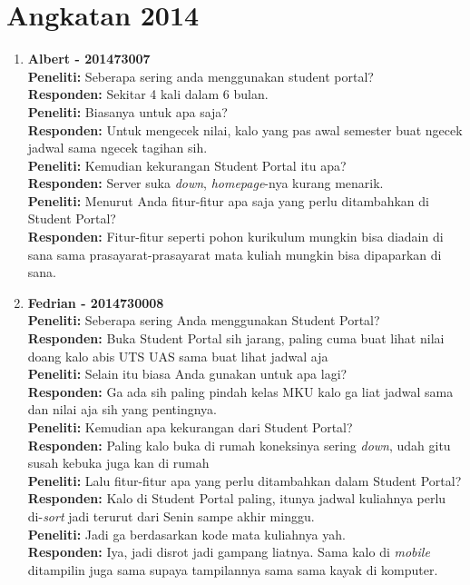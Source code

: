 \section{Angkatan 2014}
\begin{enumerate}
	\item\textbf{Albert - 201473007}\\
	\textbf{Peneliti:} Seberapa sering anda menggunakan student portal?\\
	\textbf{Responden:} Sekitar 4 kali dalam 6 bulan.\\
	\textbf{Peneliti:} Biasanya untuk apa saja?\\
	\textbf{Responden:} Untuk mengecek nilai, kalo yang pas awal semester buat ngecek jadwal sama ngecek tagihan sih.\\
	\textbf{Peneliti:} Kemudian kekurangan Student Portal itu apa?\\
	\textbf{Responden:} Server suka \textit{down}, \textit{homepage}-nya kurang menarik.\\
	\textbf{Peneliti:} Menurut Anda fitur-fitur apa saja yang perlu ditambahkan di Student Portal?\\
	\textbf{Responden:} Fitur-fitur seperti pohon kurikulum mungkin bisa diadain di sana sama prasayarat-prasayarat mata kuliah mungkin bisa dipaparkan di sana.\\
	
	\item\textbf{Fedrian - 2014730008}\\
	\textbf{Peneliti:} Seberapa sering Anda menggunakan Student Portal?\\
	\textbf{Responden:} Buka Student Portal sih jarang, paling cuma buat lihat nilai doang kalo abis UTS UAS sama buat lihat jadwal aja\\
	\textbf{Peneliti:} Selain itu biasa Anda gunakan untuk apa lagi?\\
	\textbf{Responden:} Ga ada sih paling pindah kelas MKU kalo ga liat jadwal sama dan nilai aja sih yang pentingnya.\\
	\textbf{Peneliti:} Kemudian apa kekurangan dari Student Portal?\\
	\textbf{Responden:} Paling kalo buka di rumah koneksinya sering \textit{down}, udah gitu susah kebuka juga kan di rumah\\
	\textbf{Peneliti:} Lalu fitur-fitur apa yang perlu ditambahkan dalam Student Portal?\\
	\textbf{Responden:} Kalo di Student Portal paling, itunya jadwal kuliahnya perlu di-\textit{sort} jadi terurut dari Senin sampe akhir minggu.\\
	\textbf{Peneliti:} Jadi ga berdasarkan kode mata kuliahnya yah.\\
	\textbf{Responden:} Iya, jadi disrot jadi gampang liatnya. Sama kalo di \textit{mobile} ditampilin juga sama supaya tampilannya sama sama kayak di komputer.\\
	

\end{enumerate}
